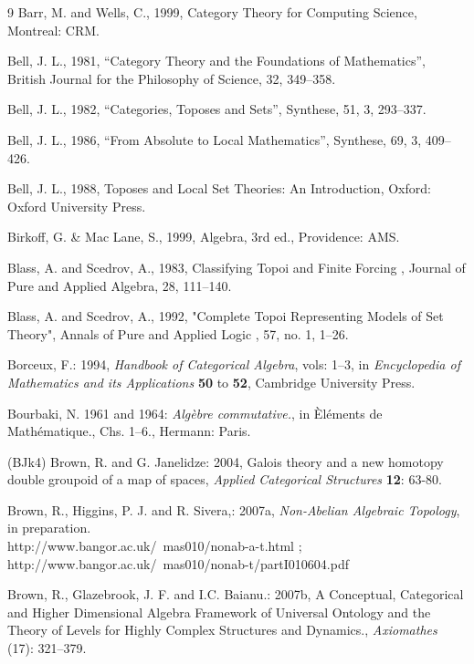 \documentclass[12pt]{article}
\begin{document}
\begin{thebibliography} {9}
Barr, M. and Wells, C., 1999, Category Theory for Computing Science, Montreal: CRM. 

Bell, J. L., 1981, ``Category Theory and the Foundations of Mathematics'', British Journal for the Philosophy of Science, 32, 349--358. 
 
Bell, J. L., 1982, ``Categories, Toposes and Sets'', Synthese, 51, 3, 293--337. 
 
Bell, J. L., 1986, ``From Absolute to Local Mathematics'', Synthese, 69, 3, 409--426. 

Bell, J. L., 1988, Toposes and Local Set Theories: An Introduction, Oxford: Oxford University Press. 

Birkoff, G. \& Mac Lane, S., 1999, Algebra, 3rd ed., Providence: AMS.  

Blass, A. and Scedrov, A., 1983, Classifying Topoi and Finite Forcing , Journal of Pure and Applied Algebra, 28, 111--140. 

Blass, A. and Scedrov, A., 1992, "Complete Topoi Representing Models of Set Theory", Annals of Pure and Applied Logic , 57, no. 1, 1--26.  


Borceux, F.: 1994, \emph{Handbook of Categorical Algebra}, vols: 1--3, 
in {\em Encyclopedia of Mathematics and its Applications} \textbf{50} to \textbf{52}, Cambridge University Press.

Bourbaki, N. 1961 and 1964: \emph{Alg\`{e}bre commutative.},
in \`{E}l\'{e}ments de Math\'{e}matique., Chs. 1--6., Hermann: Paris.

\bibitem (BJk4)
Brown, R. and G. Janelidze: 2004, Galois theory and a new homotopy
double groupoid of a map of spaces, \emph{Applied Categorical
Structures} \textbf{12}: 63-80.

Brown, R., Higgins, P. J. and R. Sivera,: 2007a, \emph{Non-Abelian
Algebraic Topology}, in preparation.\\
http://www.bangor.ac.uk/~mas010/nonab-a-t.html ; \\
http://www.bangor.ac.uk/~mas010/nonab-t/partI010604.pdf

Brown, R., Glazebrook, J. F. and I.C. Baianu.: 2007b, A Conceptual, Categorical and Higher Dimensional Algebra Framework of Universal Ontology and the Theory of Levels for Highly Complex Structures and Dynamics., \emph{Axiomathes} (17): 321--379.


\end{thebibliography}
\end{document}
